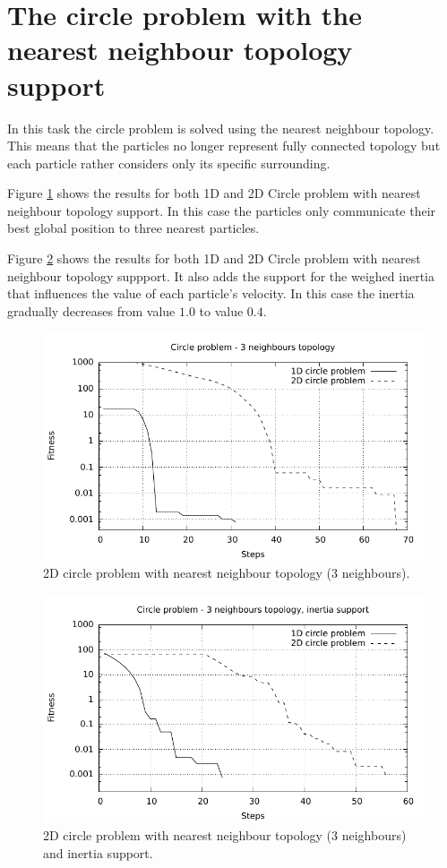 \section{The circle problem with the nearest neighbour topology support}
In this task the circle problem is solved using the nearest neighbour topology. This means that the particles no longer represent fully connected topology but each particle rather considers only its specific surrounding.

Figure \ref{fig:2Dcircle_nntopology} shows the results for both 1D and 2D Circle problem with nearest neighbour topology support. In this case the particles only communicate their best global position to three nearest particles.

Figure \ref{fig:2Dcircle_nntopology_inertia} shows the results for both 1D and 2D Circle problem with nearest neighbour topology suppport. It also adds the support for the weighed inertia that influences the value of each particle's velocity. In this case the inertia gradually decreases from value $1.0$ to value $0.4$.

\begin{figure}[!h]
	\centering
		\includegraphics[width=15cm]{img/2a.pdf}
	\caption{2D circle problem with nearest neighbour topology (3 neighbours).}
	\label{fig:2Dcircle_nntopology}
\end{figure}

\begin{figure}[!h]
	\centering
		\includegraphics[width=15cm]{img/2b.pdf}
	\caption{2D circle problem with nearest neighbour topology (3 neighbours) and inertia support.}
	\label{fig:2Dcircle_nntopology_inertia}
\end{figure}